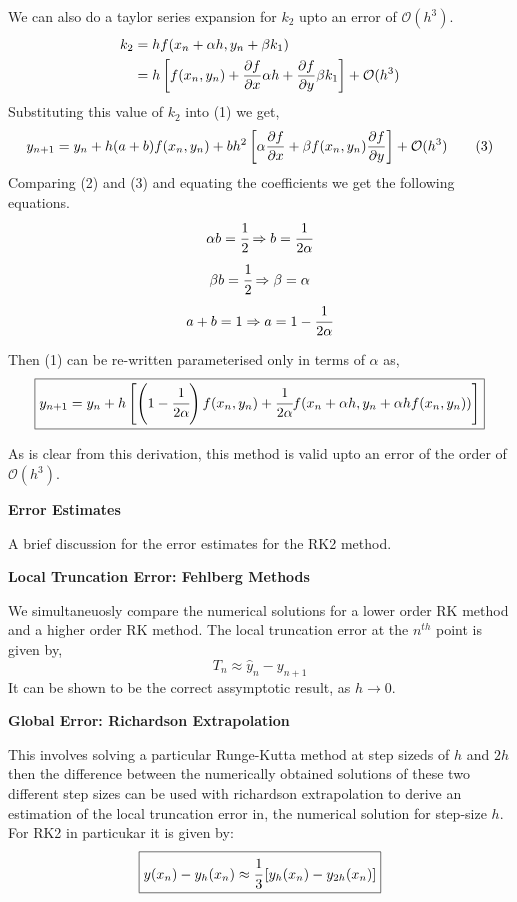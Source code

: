 \documentclass{scrartcl}
\newcommand{\bigO}{\mathcal{O}}
\begin{document}
We can also do a taylor series expansion for $k_2$ upto an error of $\bigO(h^3)$.
\begin{align*}
    k_2 &= hf(x_n + \alpha h, y_n + \beta k_1) \\ 
        &= h\left[ f(x_n, y_n) + \pdv{f}{x}\alpha h + \pdv{f}{y}\beta k_1 \right] + \bigO(h^3) \\ 
\end{align*}
Substituting this value of $k_2$ into (1) we get, 
\begin{align*}
    y_{n+1} = y_n + h(a + b)f(x_n, y_n) + bh^2\left[ \alpha \pdv{f}{x} + \beta f(x_n, y_n) \pdv{f}{y} \right] + \bigO(h^3) \tag{3}
\end{align*}
Comparing (2) and (3) and equating the coefficients we get the following equations.
$$\alpha b = \cfrac{1}{2} \Rightarrow b = \cfrac{1}{2\alpha}$$
$$\beta b = \cfrac{1}{2} \Rightarrow \beta = \alpha$$
$$a + b = 1 \Rightarrow a = 1 - \cfrac{1}{2\alpha}$$

Then (1) can be re-written parameterised only in terms of $\alpha$ as,
$$\boxed{y_{n+1} = y_n + h\left[\left(1 - \cfrac{1}{2\alpha}\right)f(x_n, y_n) + \cfrac{1}{2\alpha}f(x_n + \alpha h, y_n + \alpha hf(x_n, y_n))\right]}$$

As is clear from this derivation, this method is valid upto an error of the order of $\bigO(h^3)$.

\noindent \textbf{Error Estimates}

\noindent A brief discussion for the error estimates for  the RK2 method.

\noindent \textbf{Local Truncation Error: Fehlberg Methods}

\noindent We simultaneuosly compare the numerical solutions for a lower order RK method and a higher order RK method. The local 
truncation error at the $n^{th}$ point is given by, 
$$\boxed{T_{n} \approx \hat{y}_{n} - y_{n+1}}$$
It can be shown to be the correct assymptotic result, as $h \to 0$. 

\noindent \textbf{Global Error: Richardson Extrapolation}

\noindent This involves solving a particular Runge-Kutta method at step sizeds of $h$ and $2h$ then the difference between the numerically obtained solutions of these two different step sizes can be used
with richardson extrapolation to derive an estimation of the local truncation error in, the numerical solution for step-size $h$. For RK2 in particukar it is given by:
$$\boxed{y(x_n) - y_h(x_n) \approx \cfrac{1}{3}\left[ y_h(x_n) - y_{2h}(x_n) \right]}$$
\end{document}
